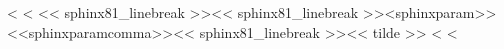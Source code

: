 \documentclass[letterpaper,10pt,english]{sphinxmanual}
\begin{document}
\begin{fulllineitems}
\label{\detokenize{index:foo}}
<%
\pysigstartsignatures
<%
\pysiglinewithargsret<< sphinx81_linebreak >>{}<< sphinx81_linebreak >>{\<<sphinxparam>>{}<<sphinxparamcomma>>{}}<< sphinx81_linebreak >>{}<< tilde >>
<%
\pysigstopsignatures
<%
\begin{quote}\end{quote}

\end{fulllineitems}



\vspace{10px}




\vspace{-5px}
\end{document}
